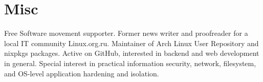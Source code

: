 \documentclass[10pt,a4]{moderncv}
\begin{document}

\section{Misc}
Free Software movement supporter. Former news writer and proofreader for a local IT community
Linux.org.ru. Maintainer of Arch Linux User Repository and nixpkgs packages. Active on GitHub,
interested in backend and web development in general. Special interest in practical information
security, network, filesystem, and OS-level application hardening and isolation.
\end{document}
